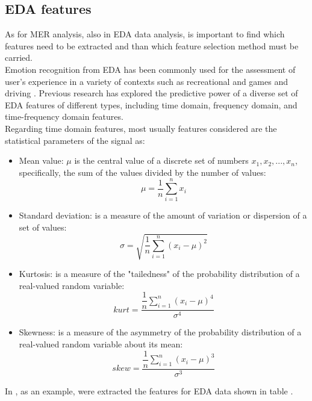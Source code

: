 \subsection{EDA features}
As for MER analysis, also in EDA data analysis, is important to find which features need to be extracted and than which feature selection method must be carried.
\\ \indent
Emotion recognition from EDA has been commonly used for the assessment of user's experience in a variety of contexts such as recreational and games \cite{drachen2010correlation} and driving \cite{healey2005detecting}. Previous research has explored the predictive power of a diverse set of EDA features of different types, including time domain, frequency domain, and time-frequency domain features.
\\ \indent
Regarding time domain features, most usually features considered are the statistical parameters of the signal as:
\begin{itemize}
	\item Mean value: $\mu$ is the central value of a discrete set of numbers $x_1,x_2,...,x_n$, specifically, the sum of the values divided by the number of values:
		\begin{equation}
		\mu=\dfrac{1}{n} \sum_{i=1}^{n}{x_i}
		\end{equation}
	\item Standard deviation:  is a measure of the amount of variation or dispersion of a set of values:
		\begin{equation}
		\sigma=\sqrt{\dfrac{1}{n}\sum_{i=1}^{n}({x_i-\mu})^2}
		\end{equation}
	\item Kurtosis: is a measure of the "tailedness" of the probability distribution of a real-valued random variable:
		\begin{equation}
		kurt=\dfrac{\dfrac{1}{n} \sum_{i=1}^{n}{(x_i-\mu)^4}}{\sigma^4}
		\end{equation}
	\item Skewness: is a measure of the asymmetry of the probability distribution of a real-valued random variable about its mean:
		\begin{equation}
		skew=\dfrac{\dfrac{1}{n} \sum_{i=1}^{n}{(x_i-\mu)^3}}{\sigma^3}
		\end{equation}
\end{itemize}
In \cite{ghaderyan2016efficient}, as an example, were extracted the features for EDA data shown in table .
